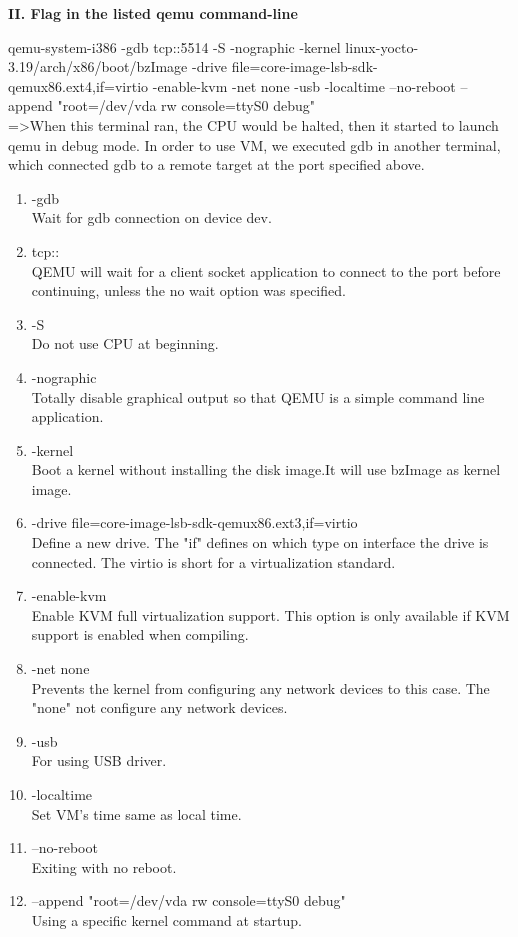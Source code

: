 \documentclass[english,10pt,letterpaper,onecolumn]{IEEEtran}
\begin{document}
\begin{center}
\begin{center}
{\bf II. Flag in the listed qemu command-line}
\end{center}
qemu-system-i386 -gdb tcp::5514 -S -nographic -kernel linux-yocto-3.19/arch/x86/boot/bzImage  -drive file=core-image-lsb-sdk-qemux86.ext4,if=virtio -enable-kvm -net none -usb -localtime --no-reboot --append "root=/dev/vda rw console=ttyS0 debug"\\
  =\textgreater When this terminal ran, the CPU would be halted, then it started to launch qemu in debug mode. In order to use VM, we executed gdb in another terminal, which connected gdb to a remote target at the port specified above.\\
  
\begin{enumerate}
   \item -gdb\\
   Wait for gdb connection on device dev.
   \item tcp::\\ 
   QEMU will wait for a client socket application to connect to the port before continuing, unless the no wait option was specified.
   \item-S\\ 
   Do not use CPU at beginning. 
   \item-nographic\\
   Totally disable graphical output so that QEMU is a simple command line application.
   \item-kernel\\
   Boot a kernel without installing the disk image.It will use bzImage as kernel image.
   \item-drive file=core-image-lsb-sdk-qemux86.ext3,if=virtio\\
   Define a new drive. The "if" defines on which type on interface the drive is connected. The virtio is short for a virtualization standard.
   \item-enable-kvm\\
   Enable KVM full virtualization support. This option is only available if KVM support is enabled when compiling. 
   \item-net none\\
   Prevents the kernel from configuring any network devices to this case. The "none" not configure any network devices.
   \item-usb\\ 
   For using USB driver.
   \item -localtime\\
   Set VM's time same as local time.
   \item --no-reboot \\
   Exiting with no reboot.
    \item --append "root=/dev/vda rw console=ttyS0 debug"\\
   Using a specific kernel command at startup.
  \end{enumerate}

\end{center}
\end{document}
